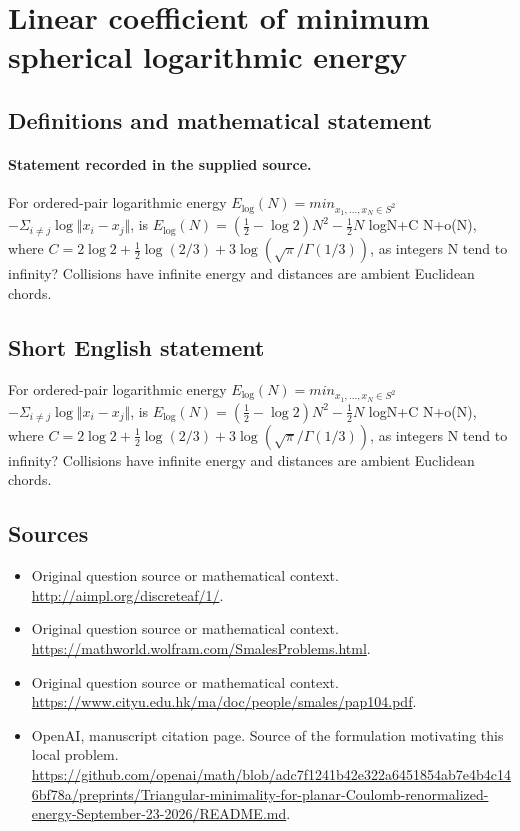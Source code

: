 \documentclass[11pt]{article}
\begin{document}
\section*{Linear coefficient of minimum spherical logarithmic energy}\label{30007111}
\subsection{Definitions and mathematical statement}
\paragraph{Statement recorded in the supplied source.}
For ordered-pair logarithmic energy $E_{\log} (N)=min_{x_{1},\dots ,x_N\in S^{2}}$ $-\Sigma _{i\neq j}\log \Vert x_i-x_j\Vert $, is $E_{\log} (N)=(\tfrac12 -\log 2)N^{2}-\tfrac12 N$ logN+C N+o(N), where $C=2\log 2+\tfrac12 \log (2/3)+3\log (\surd \pi /\Gamma (1/3))$, as integers N tend to infinity? Collisions have infinite energy and distances are ambient Euclidean chords.
\subsection{Short English statement}
For ordered-pair logarithmic energy $E_{\log} (N)=min_{x_{1},\dots ,x_N\in S^{2}}$ $-\Sigma _{i\neq j}\log \Vert x_i-x_j\Vert $, is $E_{\log} (N)=(\tfrac12 -\log 2)N^{2}-\tfrac12 N$ logN+C N+o(N), where $C=2\log 2+\tfrac12 \log (2/3)+3\log (\surd \pi /\Gamma (1/3))$, as integers N tend to infinity? Collisions have infinite energy and distances are ambient Euclidean chords.
\subsection{Sources}
\begin{itemize}
\item[S1] Original question source or mathematical context.
\url{http://aimpl.org/discreteaf/1/}.
\item[S2] Original question source or mathematical context.
\url{https://mathworld.wolfram.com/SmalesProblems.html}.
\item[S3] Original question source or mathematical context.
\url{https://www.cityu.edu.hk/ma/doc/people/smales/pap104.pdf}.
\item[S4] OpenAI, manuscript citation page. Source of the formulation motivating this local problem.
\url{https://github.com/openai/math/blob/adc7f1241b42e322a6451854ab7e4b4c146bf78a/preprints/Triangular-minimality-for-planar-Coulomb-renormalized-energy-September-23-2026/README.md}.
\end{itemize}
\end{document}
